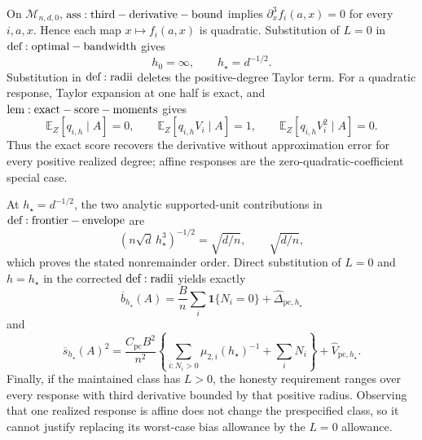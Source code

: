 On \(\mathcal M_{n,d,0}\), \({\rm ass:third-derivative-bound}\) implies \(\partial_x^3f_i(a,x)=0\) for every \(i,a,x\).  Hence each map \(x\mapsto f_i(a,x)\) is quadratic.  Substitution of \(L=0\) in \({\rm def:optimal-bandwidth}\) gives
\[
 h_0=\infty,\qquad h_\star=d^{-1/2}.
\]
Substitution in \({\rm def:radii}\) deletes the positive-degree Taylor term.  For a quadratic response, Taylor expansion at one half is exact, and \({\rm lem:exact-score-moments}\) gives
\[
 \mathbb E_Z[q_{i,h}\mid A]=0,
 \qquad \mathbb E_Z[q_{i,h}V_i\mid A]=1,
 \qquad \mathbb E_Z[q_{i,h}V_i^2\mid A]=0.
\]
Thus the exact score recovers the derivative without approximation error for every positive realized degree; affine responses are the zero-quadratic-coefficient special case.

At \(h_\star=d^{-1/2}\), the two analytic supported-unit contributions in \({\rm def:frontier-envelope}\) are
\[
 (n\sqrt d\,h_\star^3)^{-1/2}=\sqrt{d/n},
 \qquad \sqrt{d/n},
\]
which proves the stated nonremainder order.  Direct substitution of \(L=0\) and \(h=h_\star\) in the corrected \({\rm def:radii}\) yields exactly
\[
 \overline b_{h_\star}(A)=\frac Bn\sum_i\mathbf1\{N_i=0\}
 +\widehat\Delta_{\mathrm{pc},h_\star}
\]
and
\[
 \overline s_{h_\star}(A)^2
 =\frac{C_{\mathrm{pc}}B^2}{n^2}
 \left\{\sum_{i:N_i>0}\mu_{2,i}(h_\star)^{-1}+\sum_iN_i\right\}
 +\widehat V_{\mathrm{pc},h_\star}.
\]
Finally, if the maintained class has \(L>0\), the honesty requirement ranges over every response with third derivative bounded by that positive radius.  Observing that one realized response is affine does not change the prespecified class, so it cannot justify replacing its worst-case bias allowance by the \(L=0\) allowance.